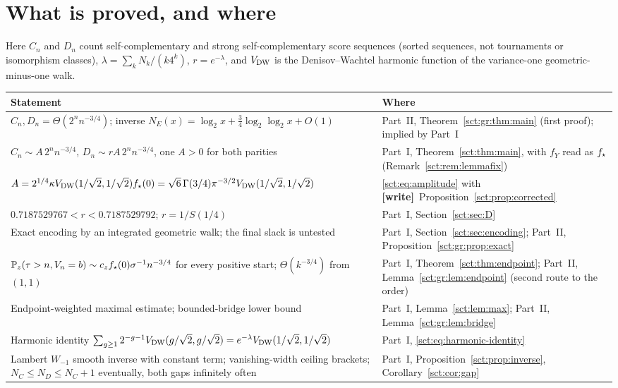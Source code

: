 \documentclass[11pt,letterpaper]{article}
\theoremstyle{definition}\newtheorem{remark}[theorem]{Remark}
\newcommand{\Pp}{\mathbb P}\newcommand{\Ee}{\mathbb E}
\newcommand{\fY}{f_Y}\newcommand{\code}[1]{\texttt{#1}}
\newcommand{\wtag}{\textup{\textbf{[write]}}}
\begin{document}
\section*{What is proved, and where}\label{sct:sec:status}
Here $C_n$ and $D_n$ count self-complementary and strong self-complementary score sequences (sorted sequences, not tournaments or isomorphism classes), $\lambda=\sum_kN_k/(k4^k)$, $r=e^{-\lambda}$, and $V_{\mathrm{DW}}$ is the Denisov--Wachtel harmonic function of the variance-one geometric-minus-one walk.
\begin{center}
\small
\begin{tabular}{@{}>{\raggedright\arraybackslash}p{} >{\raggedright\arraybackslash}p{}@{}}
\toprule
Statement & Where\\
\midrule
$C_n,D_n=\Theta(2^nn^{-3/4})$; inverse $N_E(x)=\log_2x+\frac34\log_2\log_2x+O(1)$ & Part~II, Theorem~\ref{sct:gr:thm:main} (first proof); implied by Part~I\\
$C_n\sim A\,2^nn^{-3/4}$, $D_n\sim rA\,2^nn^{-3/4}$, one $A>0$ for both parities & Part~I, Theorem~\ref{sct:thm:main}, with $\fY$ read as $f_\star$ (Remark~\ref{sct:rem:lemmafix})\\
$A=2^{1/4}\kappa V_{\mathrm{DW}}(1/\sqrt2,1/\sqrt2)f_\star(0)=\sqrt6\,\Gamma(3/4)\pi^{-3/2}V_{\mathrm{DW}}(1/\sqrt2,1/\sqrt2)$ & \eqref{sct:eq:amplitude} with \wtag\ Proposition~\ref{sct:prop:corrected}\\
$0.7187529767<r<0.7187529792$; $r=1/S(1/4)$ & Part~I, Section~\ref{sct:sec:D}\\
Exact encoding by an integrated geometric walk; the final slack is untested & Part~I, Section~\ref{sct:sec:encoding}; Part~II, Proposition~\ref{sct:gr:prop:exact}\\
$\Pp_z(\tau>n,V_n=b)\sim c_z\fstar(0)\sigma^{-1}n^{-3/4}$ for every positive start; $\Theta(k^{-3/4})$ from $(1,1)$ & Part~I, Theorem~\ref{sct:thm:endpoint}; Part~II, Lemma~\ref{sct:gr:lem:endpoint} (second route to the order)\\
Endpoint-weighted maximal estimate; bounded-bridge lower bound & Part~I, Lemma~\ref{sct:lem:max}; Part~II, Lemma~\ref{sct:gr:lem:bridge}\\
Harmonic identity $\sum_{g\ge1}2^{-g-1}V_{\mathrm{DW}}(g/\sqrt2,g/\sqrt2)=e^{-\lambda}V_{\mathrm{DW}}(1/\sqrt2,1/\sqrt2)$ & Part~I, \eqref{sct:eq:harmonic-identity}\\
Lambert $W_{-1}$ smooth inverse with constant term; vanishing-width ceiling brackets; $N_C\le N_D\le N_C+1$ eventually, both gaps infinitely often & Part~I, Proposition~\ref{sct:prop:inverse}, Corollary~\ref{sct:cor:gap}\\

\end{tabular}
\end{center}
\end{document}
